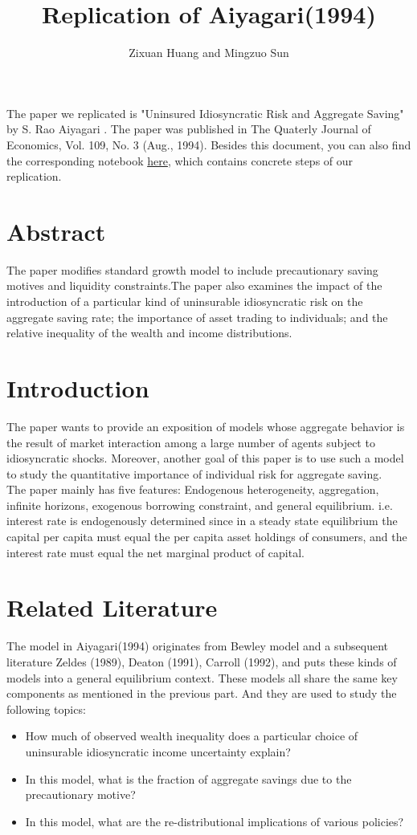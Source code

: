 \documentclass[]{article}
\title{Replication of Aiyagari(1994)}
\author{Zixuan Huang and Mingzuo Sun}
\date{}
\begin{document}
\linespread{2}
\maketitle




The paper we replicated is "Uninsured Idiosyncratic Risk and Aggregate Saving" by S. Rao Aiyagari \cite{1994}. The paper was published in The Quaterly Journal of Economics, Vol. 109, No. 3 (Aug., 1994). Besides this document, you can also find the corresponding notebook \href{run:../Aiyagari1994QJE.ipynb}{here}, which contains concrete steps of our replication.

\section{Abstract}
The paper modifies standard growth model to include precautionary saving motives and liquidity constraints.The paper also examines the impact of the introduction of a particular kind of uninsurable idiosyncratic risk on the aggregate saving rate; the importance of asset trading to individuals; and the relative inequality of the wealth and income distributions. 

\section{Introduction}
The paper wants to provide an exposition of models whose aggregate behavior is the result of market interaction among a large number of agents subject to idiosyncratic shocks. Moreover, another goal of this paper is to use such a model to study the quantitative importance of individual risk for aggregate saving.\\

The paper mainly has five features: Endogenous heterogeneity, aggregation, infinite horizons, exogenous borrowing constraint, and general equilibrium. i.e. interest rate is endogenously determined since in a steady state equilibrium the capital per capita must equal the per capita asset holdings of consumers, and the interest rate must equal the net marginal product of capital. 

\section{Related Literature}
The model in Aiyagari(1994) originates from Bewley model and a subsequent literature Zeldes (1989), Deaton (1991), Carroll (1992), and puts these kinds of models into a general equilibrium context. These models all share the same key components as mentioned in the previous part. And they are used to study the following topics:
\begin{itemize}
	\item How much of observed wealth inequality does a particular choice of uninsurable idiosyncratic income uncertainty explain? 
	\item In this model, what is the fraction of aggregate savings due to the precautionary motive? 
	\item In this model, what are the re-distributional implications of various policies?
\end{itemize}
\end{document}
